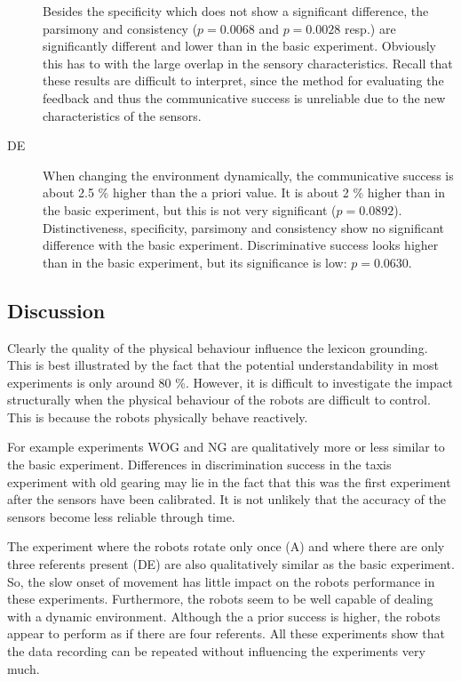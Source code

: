 \begin{description}
Besides the specificity which does not show a significant difference, the parsimony and consistency ($p=0.0068$ and $p=0.0028$ resp.) are significantly different and lower than in the basic experiment. Obviously this has to with the large overlap in the sensory characteristics. Recall that these results are difficult to interpret, since the method for evaluating the feedback and thus the communicative success is unreliable due to the new characteristics of the sensors.

\item[DE] When changing the environment dynamically, the communicative success is about 2.5 \% higher than the a priori value. It is about 2 \% higher than in the basic experiment, but this is not very significant ($p=0.0892$). Distinctiveness, specificity, parsimony and consistency show no significant difference with the basic experiment. Discriminative success looks higher than in the basic experiment, but its significance is low: $p=0.0630$.
\end{description}

\subsection{Discussion}

Clearly the quality of the physical behaviour influence the lexicon grounding. This is best illustrated by the fact that the potential understandability in most experiments is only around 80 \%. However, it is difficult to investigate the impact structurally when the physical behaviour of the robots are difficult to control. This is because the robots physically behave reactively.

For example experiments WOG and NG are qualitatively more or less similar to the basic experiment. Differences in discrimination success in the taxis experiment with old gearing may lie in the fact that this was the first experiment after the sensors have been calibrated. It is not unlikely that the accuracy of the sensors become less reliable through time. 

The experiment where the robots rotate only once (A) and where there are only three referents present (DE) are also qualitatively similar as the basic experiment. So, the slow onset of movement has little impact on the robots performance in these experiments. Furthermore, the robots seem to be well capable of dealing with a dynamic environment. Although the a prior success is higher, the robots appear to perform as if there are four referents. All these experiments show that the data recording can be repeated without influencing the experiments very much.


